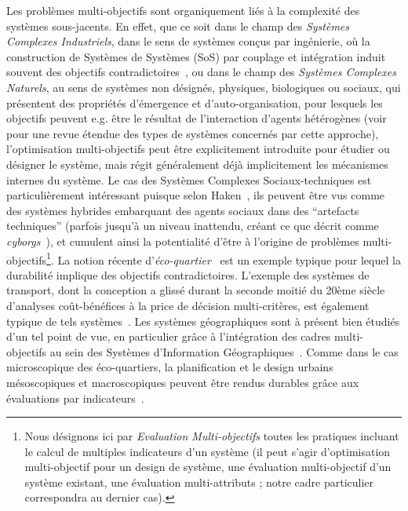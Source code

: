 {}{
Les problèmes multi-objectifs sont organiquement liés à la complexité des systèmes sous-jacents. En effet, que ce soit dans le champ des \emph{Systèmes Complexes Industriels}, dans le sens de systèmes conçus par ingénierie, où la construction de Systèmes de Systèmes (SoS) par couplage et intégration induit souvent des objectifs contradictoires~\cite{marler2004survey}, ou dans le champ des \emph{Systèmes Complexes Naturels}, au sens de systèmes non désignés, physiques, biologiques ou sociaux, qui présentent des propriétés d'émergence et d'auto-organisation, pour lesquels les objectifs peuvent e.g. être le résultat de l'interaction d'agents hétérogènes (voir~\cite{newman2011complex} pour une revue étendue des types de systèmes concernés par cette approche), l'optimisation multi-objectifs peut être explicitement introduite pour étudier ou désigner le système, mais régit généralement déjà implicitement les mécanismes internes du système. Le cas des Systèmes Complexes Sociaux-techniques est particulièrement intéressant puisque selon Haken~\cite{haken2003face}, ils peuvent être vus comme des systèmes hybrides embarquant des agents sociaux dans des ``artefacts techniques'' (parfois jusqu'à un niveau inattendu, créant ce que  décrit comme \emph{cyborgs}~\cite{picon2013smart}), et cumulent ainsi la potentialité d'être à l'origine de problèmes multi-objectifs\footnote{Nous désignons ici par \emph{Evaluation Multi-objectifs} toutes les pratiques incluant le calcul de multiples indicateurs d'un système (il peut s'agir d'optimisation multi-objectif pour un design de système, une évaluation multi-objectif d'un système existant, une évaluation multi-attributs ; notre cadre particulier correspondra au dernier cas).}. La notion récente d'\emph{éco-quartier}~\cite{souami2012ecoquartiers} est un exemple typique pour lequel la durabilité implique des objectifs contradictoires. L'exemple des systèmes de transport, dont la conception a glissé durant la seconde moitié du 20ème siècle d'analyses coût-bénéfices à la price de décision multi-critères, est également typique de tels systèmes~\cite{bavoux2005geographie}. Les systèmes géographiques sont à présent bien étudiés d'un tel point de vue, en particulier grâce à l'intégration des cadres multi-objectifs au sein des Systèmes d'Information Géographiques~\cite{carver1991integrating}. Comme dans le cas microscopique des éco-quartiers, la planification et le design urbains mésoscopiques et macroscopiques peuvent être rendus durables grâce aux évaluations par indicateurs~\cite{jegou2012evaluation}.
}



